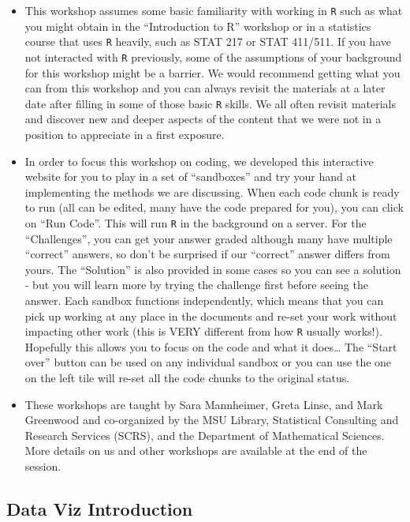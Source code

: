\documentclass[
]{article}
\begin{document}
\begin{itemize}
\item
  This workshop assumes some basic familiarity with working in
  \texttt{R} such as what you might obtain in the ``Introduction to R''
  workshop or in a statistics course that uses \texttt{R} heavily, such
  as STAT 217 or STAT 411/511. If you have not interacted with
  \texttt{R} previously, some of the assumptions of your background for
  this workshop might be a barrier. We would recommend getting what you
  can from this workshop and you can always revisit the materials at a
  later date after filling in some of those basic \texttt{R} skills. We
  all often revisit materials and discover new and deeper aspects of the
  content that we were not in a position to appreciate in a first
  exposure.
\item
  In order to focus this workshop on coding, we developed this
  interactive website for you to play in a set of ``sandboxes'' and try
  your hand at implementing the methods we are discussing. When each
  code chunk is ready to run (all can be edited, many have the code
  prepared for you), you can click on ``Run Code''. This will run
  \texttt{R} in the background on a server. For the ``Challenges'', you
  can get your answer graded although many have multiple ``correct''
  answers, so don't be surprised if our ``correct'' answer differs from
  yours. The ``Solution'' is also provided in some cases so you can see
  a solution - but you will learn more by trying the challenge first
  before seeing the answer. Each sandbox functions independently, which
  means that you can pick up working at any place in the documents and
  re-set your work without impacting other work (this is VERY different
  from how \texttt{R} usually works!). Hopefully this allows you to
  focus on the code and what it does\ldots{} The ``Start over'' button
  can be used on any individual sandbox or you can use the one on the
  left tile will re-set all the code chunks to the original status.
\item
  These workshops are taught by Sara Mannheimer, Greta Linse, and Mark
  Greenwood and co-organized by the MSU Library, Statistical Consulting
  and Research Services (SCRS), and the Department of Mathematical
  Sciences. More details on us and other workshops are available at the
  end of the session.
\end{itemize}

\hypertarget{data-viz-introduction}{%
\subsection{Data Viz Introduction}\label{data-viz-introduction}}
\end{document}
